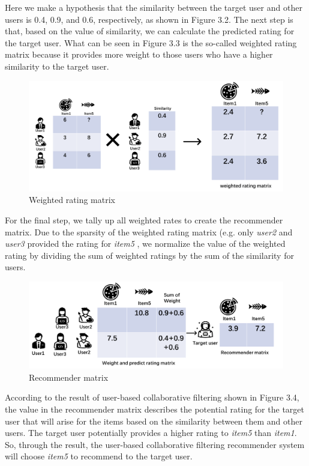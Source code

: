 Here we make a hypothesis that the similarity between the target user and other users is 0.4, 0.9, and 0.6, respectively, as shown in Figure 3.2. The next step is that, based on the value of similarity, we can calculate the predicted rating for the target user. What can be seen in Figure 3.3 is the so-called weighted rating matrix because it provides more weight to those users who have a higher similarity to the target user.
\begin{figure}[htbp]
\centering
\includegraphics[scale=0.5]{figure/rating3.png}
\caption{Weighted rating matrix}
\end{figure}
For the final step, we tally up all weighted rates to create the recommender matrix. Due to the sparsity of the weighted rating matrix (e.g. only \textit{user2} and \textit{user3} provided the rating for \textit{item5} , we normalize the value of the weighted rating by dividing the sum of weighted ratings by the sum of the similarity for users.
\begin{figure}[htbp]
\centering
\includegraphics[scale=0.5]{figure/rating4.png}
\caption{Recommender matrix}
\end{figure}
According to the result of user-based collaborative filtering shown in Figure 3.4, the value in the recommender matrix describes the potential rating for the target user that will arise for the items based on the similarity between them and other users. The target user potentially provides a higher rating to \textit{item5} than \textit{item1}. So, through the result, the user-based collaborative filtering recommender system will choose \textit{item5} to recommend to the target user.